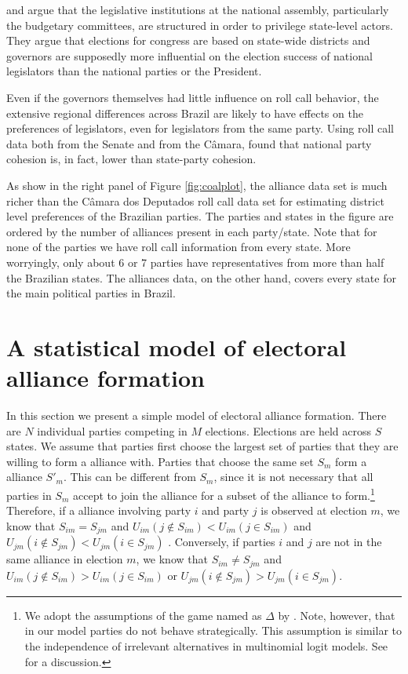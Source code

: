 \citet{Samuels:2003} and \citet{abrucio:1998} argue that the legislative institutions at the national assembly, particularly the budgetary committees, are structured in order to privilege state-level actors. They argue that  elections for congress are based on state-wide districts and governors  are supposedly more influential on the election success of national legislators than the national parties or the President.   

Even if the governors themselves had little influence on roll call behavior, the extensive regional differences across Brazil are likely to have effects on the preferences of legislators, even for legislators from the same party. Using roll call data both from the Senate and from the Câmara, \citet{desposato:2003} found that national party cohesion is, in fact, lower than state-party cohesion. 

As show in the right panel of Figure \ref{fig:coalplot}, the alliance data set is much richer than the Câmara dos Deputados roll call data set for estimating district level preferences of the Brazilian parties. The parties and states in the figure are ordered by the number of alliances present in each party/state. Note that for none of the parties we have roll call information from every state. More worryingly, only about 6 or 7 parties have representatives from more than half the Brazilian states. The alliances data, on the other hand, covers every state  for the main political parties in Brazil. 



\section{A statistical model of electoral alliance formation}

In this  section we present a simple model of electoral alliance formation. There are $N$ individual parties competing in $M$ elections. Elections are held across $S$ states. We assume that parties first choose the largest set of parties that they are willing to form a alliance with. Parties that choose the same set $S_m$ form a alliance  $S'_m$. This can be  different from $S_m$, since it is not necessary that all parties in $S_m$  accept to join the alliance for a subset of the alliance to form.\footnote{We adopt the assumptions of the game named as  $\Delta$  by \citet{hart:1983}. Note, however, that in our model parties do not behave strategically. This assumption is similar to the independence of irrelevant alternatives in multinomial logit models. See \citet{train:2003} for a discussion.} Therefore, if  a alliance involving party $i$ and party $j$ is observed at election $m$, we know that $S_{im}=S_{jm}$ and $U_{im}(j\not\in S_{im})<U_{im}(j\in S_{im})$ and $U_{jm}(i\not\in S_{jm})<U_{jm}(i\in S_{jm})$ . Conversely, if parties $i$ and $j$ are not in the same alliance in  election $m$, we know that $S_{im} \neq S_{jm}$ and $U_{im}(j\not\in S_{im})>U_{im}(j\in S_{im})$  or $U_{jm}(i\not\in S_{jm})>U_{jm}(i\in S_{jm})$.   


